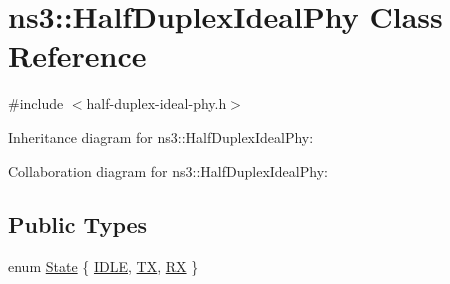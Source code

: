 \hypertarget{classns3_1_1HalfDuplexIdealPhy}{}\section{ns3\+:\+:Half\+Duplex\+Ideal\+Phy Class Reference}
\label{classns3_1_1HalfDuplexIdealPhy}


{\ttfamily \#include $<$half-\/duplex-\/ideal-\/phy.\+h$>$}



Inheritance diagram for ns3\+:\+:Half\+Duplex\+Ideal\+Phy\+:


Collaboration diagram for ns3\+:\+:Half\+Duplex\+Ideal\+Phy\+:
\subsection*{Public Types}
\begin{DoxyCompactItemize}
\item 
enum \hyperlink{classns3_1_1HalfDuplexIdealPhy_acc684e2a6ce03ae8ff429ce480f61c3a}{State} \{ \hyperlink{classns3_1_1HalfDuplexIdealPhy_acc684e2a6ce03ae8ff429ce480f61c3aaf6ddf02c196dc56c189b183e784f2094}{I\+D\+LE}, 
\hyperlink{classns3_1_1HalfDuplexIdealPhy_acc684e2a6ce03ae8ff429ce480f61c3aa6e02b7c513143f623f71938508be304e}{TX}, 
\hyperlink{classns3_1_1HalfDuplexIdealPhy_acc684e2a6ce03ae8ff429ce480f61c3aad9131877f1e84394458c8e767df5466e}{RX}
 \}
\end{DoxyCompactItemize}
